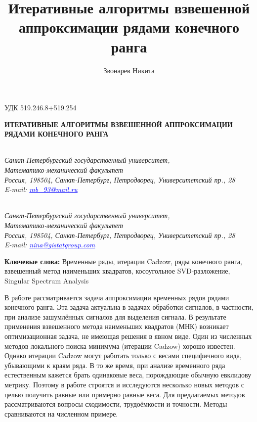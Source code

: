 \documentclass[12pt,a4paper,fleqn,leqno]{article}
\author{Звонарев Никита}
\title{Итеративные алгоритмы взвешенной аппроксимации рядами конечного ранга}
\begin{document}
\noindent УДК 519.246.8+519.254

\begin{center}{
\fontsize{18pt}{23pt}\selectfont\bf%
  \MakeUppercase{
 Итеративные алгоритмы взвешенной аппроксимации рядами конечного ранга
}}
\end{center}

\begin{center}{\bpv{}\\
\footnotesize\it Санкт-Петербургский государственный университет,\\
Математико-механический факультет
\\
\rm
Россия, 198504, Санкт-Петербург, Петродворец, Университетский пр., 28\\
E-mail: \textcolor {blue}{\underline{mb\_93@mail.ru}}}
\end{center}
\begin{center}{\\
\footnotesize\it Санкт-Петербургский государственный университет,\\
Математико-механический факультет
\\
\rm
Россия, 198504, Санкт-Петербург, Петродворец, Университетский пр., 28\\
E-mail: \textcolor {blue}{\underline{nina@gistatgroup.com}}}
\end{center}
\hspace{1.25cm}\begin{minipage}{12.16cm}\bpv\bpv\bmv \noindent
\footnotesize{\bf Ключевые слова:}\/ Временные ряды, итерации Cadzow, ряды конечного ранга, взвешенный метод наименьших квадратов, косоугольное SVD-разложение, Singular Spectrum Analysis

\bpv\bpv\noindent  В работе рассматривается задача аппроксимации временных рядов рядами конечного ранга. Эта задача актуальна в задачах обработки сигналов, в частности, при анализе зашумлённых сигналов для выделения сигнала. В результате применения взвешенного метода наименьших квадратов (МНК) возникает оптимизационная задача, не имеющая решения в явном виде. Один из численных методов локального поиска минимума (итерации Cadzow) хорошо известен. Однако  итерации Cadzow могут работать только с весами специфичного вида, убывающими к краям ряда. В то же время, при анализе временного ряда естественным кажется брать одинаковые веса, порождающие обычную евклидову метрику. Поэтому в работе строятся и исследуются несколько новых методов с целью получить равные или примерно равные веса. Для предлагаемых методов рассматриваются вопросы сходимости, трудоёмкости и точности. Методы сравниваются на численном примере.

\end{minipage}\bls\bmv
\end{document}
